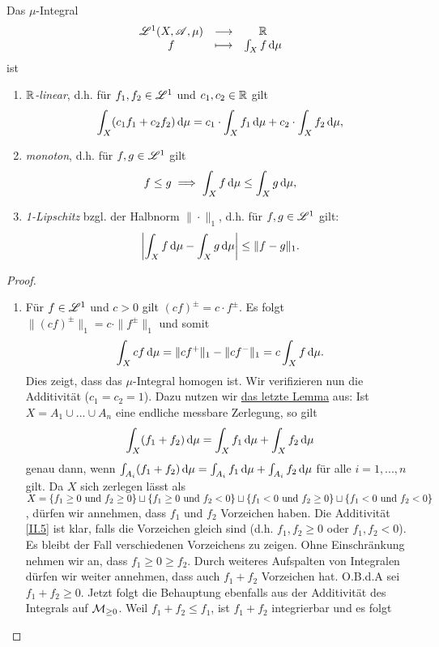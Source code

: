 \begin{satz}
\begin{mdframed}
Das $\mu$-Integral
\begin{equation*}
\begin{array}{ccc}
\mathscr{L}^1(X,\mathscr{A},\mu) & \longrightarrow & \mathbb{R} \\
f & \longmapsto & \int_X f \, \mathrm{d} \mu
\end{array}
\end{equation*}
ist
\begin{enumerate}
\item \emph{$\mathbb{R}$-linear}, d.h. für $f_1,f_2 \in \mathscr{L}^1$ und $c_1,c_2\in\mathbb{R}$ gilt
$$\int_X (c_1f_1+c_2f_2)\, \mathrm{d}\mu = c_1\cdot \int_X f_1\, \mathrm{d}\mu+c_2\cdot \int_X f_2 \, \mathrm{d}\mu,$$
\item \emph{monoton}, d.h. für $f,g\in\mathscr{L}^1$ gilt
$$f\leq g \implies \int_X f \, \mathrm{d}\mu \leq \int_X g\, \mathrm{d}\mu,$$
\item \emph{1-Lipschitz} bzgl. der Halbnorm $\|\cdot \|_1$, d.h. für $f,g\in\mathscr{L}^1$ gilt:
$$\left| \int_X f\, \mathrm{d} \mu-\int_X g\, \mathrm{d} \mu \right|\leq \|f-g\|_1.$$
\end{enumerate}
\end{mdframed}
\begin{proof}
\begin{enumerate}
\item Für $f\in \mathscr{L}^1$ und $c>0$ gilt $(cf)^\pm=c\cdot f^\pm$. Es folgt $\|(cf)^\pm\|_1=c\cdot \|f^\pm\|_1$ und somit
$$\int_X cf\, \mathrm{d}\mu = \|cf^+\|_1-\|cf^-\|_1 = c\int_Xf\, \mathrm{d}\mu.$$
Dies zeigt, dass das $\mu$-Integral homogen ist. Wir verifizieren nun die Additivität ($c_1=c_2=1$). Dazu nutzen wir \hyperref[integral-zerlegung]{das letzte Lemma} aus: Ist $X=A_1\cup...\cup A_n$ eine endliche messbare Zerlegung, so gilt
\begin{equation}\label{II.5}
\int_X(f_1+f_2)\, \mathrm{d}\mu =\int_X f_1\, \mathrm{d}\mu+\int_X f_2\, \mathrm{d}\mu
\end{equation}
genau dann, wenn $\int_{A_i}(f_1+f_2)\, \mathrm{d}\mu =\int_{A_i} f_1\, \mathrm{d}\mu+\int_{A_i} f_2\, \mathrm{d}\mu$ für alle $i=1,...,n$ gilt. Da $X$ sich zerlegen lässt als $X=\{f_1\geq 0 \text{ und } f_2\geq 0\} \sqcup \{f_1\geq 0 \text{ und } f_2 < 0\} \sqcup \{f_1< 0 \text{ und } f_2\geq 0\} \sqcup \{f_1 < 0 \text{ und } f_2 < 0\}$, dürfen wir annehmen, dass $f_1$ und $f_2$ Vorzeichen haben. Die Additivität \eqref{II.5} ist klar, falls die Vorzeichen gleich sind (d.h. $f_1,f_2\geq 0$ oder $f_1,f_2 <0$). Es bleibt der Fall verschiedenen Vorzeichens zu zeigen. Ohne Einschränkung nehmen wir an, dass $f_1 \geq 0 \geq f_2$. Durch weiteres Aufspalten von Integralen dürfen wir weiter annehmen, dass auch $f_1+f_2$ Vorzeichen hat. O.B.d.A sei $f_1+f_2\geq 0$. Jetzt folgt die Behauptung ebenfalls aus der Additivität des Integrals auf $\mathcal{M}_{\geq 0}$. Weil $f_1+f_2\leq f_1$, ist $f_1+f_2$ integrierbar und es folgt

\end{enumerate}
\end{proof}
\end{satz}
